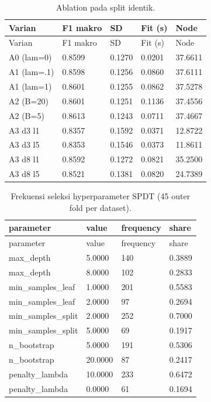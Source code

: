 \documentclass[
  conference]{IEEEtran}
\begin{document}
\begin{longtable}[]{@{}lllll@{}}
\caption{Ablation pada split identik.}\tabularnewline
\toprule\noalign{}
Varian & F1 makro & SD & Fit (s) & Node \\
\midrule\noalign{}
\endfirsthead
\toprule\noalign{}
Varian & F1 makro & SD & Fit (s) & Node \\
\midrule\noalign{}
\endhead
\bottomrule\noalign{}
\endlastfoot
A0 (lam=0) & 0.8599 & 0.1270 & 0.0201 & 37.6611 \\
A1 (lam=.1) & 0.8598 & 0.1256 & 0.0860 & 37.6111 \\
A1 (lam=1) & 0.8601 & 0.1255 & 0.0862 & 37.5278 \\
A2 (B=20) & 0.8601 & 0.1251 & 0.1136 & 37.4556 \\
A2 (B=5) & 0.8613 & 0.1243 & 0.0711 & 37.4667 \\
A3 d3 l1 & 0.8357 & 0.1592 & 0.0371 & 12.8722 \\
A3 d3 l5 & 0.8353 & 0.1546 & 0.0373 & 11.8611 \\
A3 d8 l1 & 0.8592 & 0.1272 & 0.0821 & 35.2500 \\
A3 d8 l5 & 0.8521 & 0.1381 & 0.0820 & 24.7389 \\
\end{longtable}

\begin{longtable}[]{@{}llll@{}}
\caption{Frekuensi seleksi hyperparameter SPDT (45 outer fold per
dataset).}\tabularnewline
\toprule\noalign{}
parameter & value & frequency & share \\
\midrule\noalign{}
\endfirsthead
\toprule\noalign{}
parameter & value & frequency & share \\
\midrule\noalign{}
\endhead
\bottomrule\noalign{}
\endlastfoot
max\_depth & 5.0000 & 140 & 0.3889 \\
max\_depth & 8.0000 & 102 & 0.2833 \\
min\_samples\_leaf & 1.0000 & 201 & 0.5583 \\
min\_samples\_leaf & 2.0000 & 97 & 0.2694 \\
min\_samples\_split & 2.0000 & 252 & 0.7000 \\
min\_samples\_split & 5.0000 & 69 & 0.1917 \\
n\_bootstrap & 5.0000 & 191 & 0.5306 \\
n\_bootstrap & 20.0000 & 87 & 0.2417 \\
penalty\_lambda & 10.0000 & 233 & 0.6472 \\
penalty\_lambda & 0.0000 & 61 & 0.1694 \\
\end{longtable}
\end{document}
